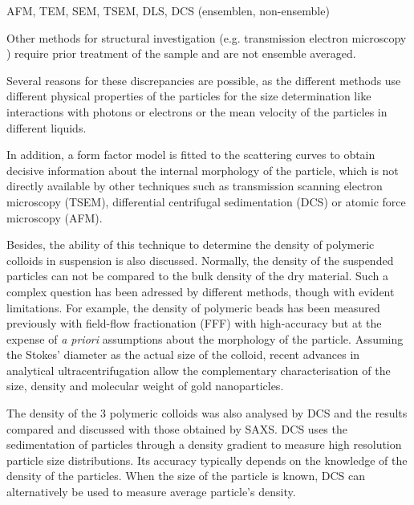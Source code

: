 AFM, TEM, SEM, TSEM, DLS, DCS (ensemblen, non-ensemble)

Other methods for structural investigation (e.g. transmission electron microscopy \citep{joensson_morphology_1991,silverstein_microstructure_1989}) require prior treatment of the sample and are not ensemble averaged. 

Several reasons for these discrepancies are possible, as the different methods use different physical properties of the particles for the size determination like interactions with photons or electrons or the mean velocity of the particles in different liquids. 

In addition, a form factor model is fitted to the scattering curves to obtain decisive information about the internal morphology of the particle, which is not directly available by other techniques such as transmission scanning electron microscopy (TSEM), differential centrifugal sedimentation (DCS)\citep{fielding_correcting_2012} or atomic force microscopy (AFM). 

Besides, the ability of this technique to determine the density of polymeric colloids in suspension is also discussed. Normally, the density of the suspended particles can not be compared to the bulk density of the dry material. Such a complex question has been adressed by different methods, though with evident limitations. For example, the density of polymeric beads has been measured previously with field-flow fractionation (FFF) with high-accuracy but at the expense of \emph{a priori} assumptions about the morphology of the particle\citep{giddings_density_1981,yang_colloid_1983,caldwell_measurement_1986}. Assuming the Stokes' diameter as the actual size of the colloid, recent advances in analytical ultracentrifugation allow the complementary characterisation of the size, density and molecular weight of gold nanoparticles\citep{carney_determination_2011}.

The density of the 3 polymeric colloids was also analysed by DCS and the results compared and discussed with those obtained by SAXS. DCS uses the sedimentation of particles through a density gradient to measure high resolution particle size distributions\citep{minelli_characterization_2014}. Its accuracy typically depends on the knowledge of the density of the particles. When the size of the particle is known, DCS can alternatively be used to measure average particle's density.

